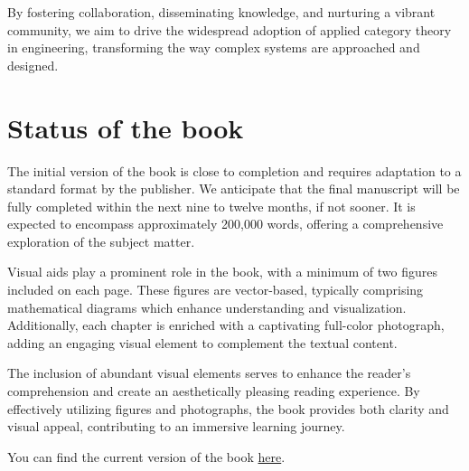 \documentclass[10pt, article, one side]{memoir}
\begin{document}
    By fostering collaboration, disseminating knowledge, and nurturing a vibrant community, we aim to drive the widespread adoption of applied category theory in engineering, transforming the way complex systems are approached and designed.

    \section{Status of the book}
    The initial version of the book is close to completion and requires adaptation to a standard format by the publisher.
    We anticipate that the final manuscript will be fully completed within the next nine to twelve months, if not sooner.
    It is expected to encompass approximately 200,000 words, offering a comprehensive exploration of the subject matter.

    Visual aids play a prominent role in the book, with a minimum of two figures included on each page.
    These figures are vector-based, typically comprising mathematical diagrams which enhance understanding and visualization.
    Additionally, each chapter is enriched with a captivating full-color photograph, adding an engaging visual element to complement the textual content.

    The inclusion of abundant visual elements serves to enhance the reader's comprehension and create an aesthetically pleasing reading experience.
    By effectively utilizing figures and photographs, the book provides both clarity and visual appeal, contributing to an immersive learning journey.

    You can find the current version of the book \href{https://z7-stage-act4e-book.zuper.ai/sync/ACT4E/ACT4E/alphubel-prod/build/last/build-public/ACT4E-public.pdf}{here}.
\end{document}
